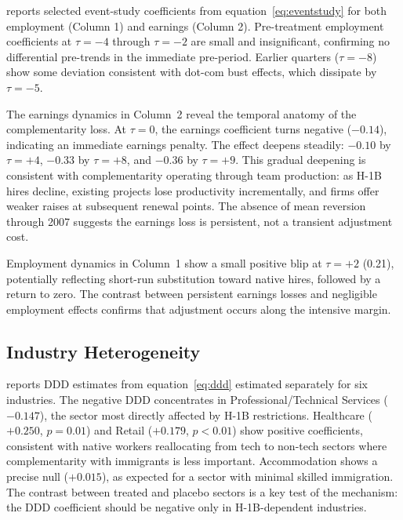 \documentclass[12pt]{article}
\begin{document}
 reports selected event-study coefficients from equation~\eqref{eq:eventstudy} for both employment (Column 1) and earnings (Column 2). Pre-treatment employment coefficients at $\tau = -4$ through $\tau = -2$ are small and insignificant, confirming no differential pre-trends in the immediate pre-period. Earlier quarters ($\tau = -8$) show some deviation consistent with dot-com bust effects, which dissipate by $\tau = -5$.

The earnings dynamics in Column~2 reveal the temporal anatomy of the complementarity loss. At $\tau = 0$, the earnings coefficient turns negative ($-0.14$), indicating an immediate earnings penalty. The effect deepens steadily: $-0.10$ by $\tau = +4$, $-0.33$ by $\tau = +8$, and $-0.36$ by $\tau = +9$. This gradual deepening is consistent with complementarity operating through team production: as H-1B hires decline, existing projects lose productivity incrementally, and firms offer weaker raises at subsequent renewal points. The absence of mean reversion through 2007 suggests the earnings loss is persistent, not a transient adjustment cost.

Employment dynamics in Column~1 show a small positive blip at $\tau = +2$ (0.21), potentially reflecting short-run substitution toward native hires, followed by a return to zero. The contrast between persistent earnings losses and negligible employment effects confirms that adjustment occurs along the intensive margin.



\subsection{Industry Heterogeneity}

 reports DDD estimates from equation~\eqref{eq:ddd} estimated separately for six industries. The negative DDD concentrates in Professional/Technical Services ($-0.147$), the sector most directly affected by H-1B restrictions. Healthcare ($+0.250$, $p = 0.01$) and Retail ($+0.179$, $p < 0.01$) show positive coefficients, consistent with native workers reallocating from tech to non-tech sectors where complementarity with immigrants is less important. Accommodation shows a precise null ($+0.015$), as expected for a sector with minimal skilled immigration. The contrast between treated and placebo sectors is a key test of the mechanism: the DDD coefficient should be negative only in H-1B-dependent industries.
\end{document}
